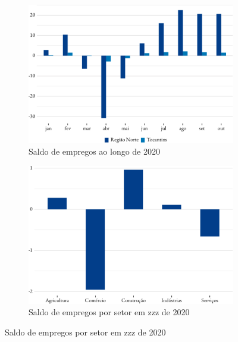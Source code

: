 \begin{figure}[!h]
\begin{subfigure}{\linewidth}
	\caption{Saldo de empregos ao longo de 2020}
	\includegraphics{fig/saldo-1.pdf}
\end{subfigure}
\begin{subfigure}{\linewidth}
	\caption{Saldo de empregos por setor em zzz de 2020}
	\includegraphics{fig/saldo_setor_to-1.pdf}
\end{subfigure}
\end{figure}

